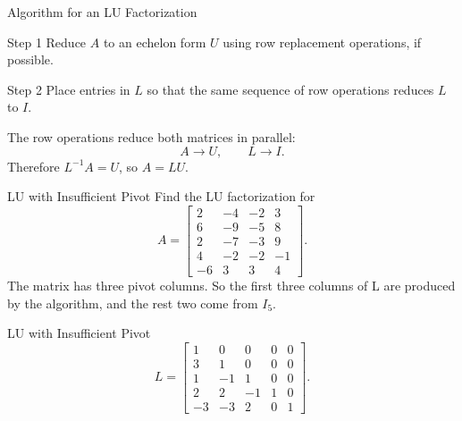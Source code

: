 \begin{frame}{Algorithm for an LU Factorization}
\begin{block}{Step 1}
Reduce $A$ to an echelon form $U$ using row replacement operations, if possible.
\end{block}
\pause
\begin{block}{Step 2}
Place entries in $L$ so that the same sequence of row operations reduces $L$ to $I$.
\end{block}
\medskip
The row operations reduce both matrices in parallel:
\[
A\longrightarrow U,
\qquad
L\longrightarrow I.
\]
Therefore $L^{-1}A=U$, so $A=LU$.
\end{frame}
\begin{frame}{LU with Insufficient Pivot}
  Find the LU factorization for
  \[
A=\begin{bmatrix}
2&-4&-2&3\\
6&-9&-5&8\\
2&-7&-3&9\\
4&-2&-2&-1\\
-6&3&3&4
\end{bmatrix}.
\]
The matrix has three pivot columns. So the first three columns of L are produced by the algorithm, and the rest two come from $I_5$.
\end{frame}

\begin{frame}{LU with Insufficient Pivot}
  \[
L=\begin{bmatrix}
1&0&0&0&0\\
3&1&0&0&0\\
1&-1&1&0&0\\
2&2&-1&1&0\\
-3&-3&2&0&1
\end{bmatrix}.
\]
\end{frame}

